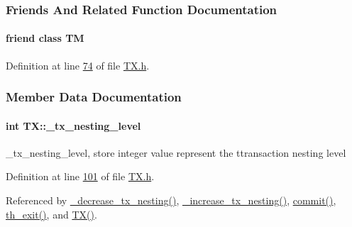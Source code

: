 \subsubsection{Friends And Related Function Documentation}
\paragraph[{\texorpdfstring{TM}{TM}}]{\setlength{\rightskip}{0pt plus 5cm}friend class {\bf TM}\hspace{0.3cm}{\ttfamily [friend]}}\hypertarget{class_t_x_adf1ccda799ef5c419cb43b8ae55eb45c_adf1ccda799ef5c419cb43b8ae55eb45c}{}\label{class_t_x_adf1ccda799ef5c419cb43b8ae55eb45c_adf1ccda799ef5c419cb43b8ae55eb45c}


Definition at line \hyperlink{_t_x_8h_source_l00074}{74} of file \hyperlink{_t_x_8h_source}{T\+X.\+h}.



\subsubsection{Member Data Documentation}
\paragraph[{\texorpdfstring{\+\_\+tx\+\_\+nesting\+\_\+level}{_tx_nesting_level}}]{\setlength{\rightskip}{0pt plus 5cm}int T\+X\+::\+\_\+tx\+\_\+nesting\+\_\+level\hspace{0.3cm}{\ttfamily [private]}}\hypertarget{class_t_x_ae8f413fd7f4fea322e7ad3c668f9898e_ae8f413fd7f4fea322e7ad3c668f9898e}{}\label{class_t_x_ae8f413fd7f4fea322e7ad3c668f9898e_ae8f413fd7f4fea322e7ad3c668f9898e}
\+\_\+tx\+\_\+nesting\+\_\+level, store integer value represent the ttransaction nesting level 

Definition at line \hyperlink{_t_x_8h_source_l00101}{101} of file \hyperlink{_t_x_8h_source}{T\+X.\+h}.



Referenced by \hyperlink{_t_x_8cpp_source_l00279}{\+\_\+decrease\+\_\+tx\+\_\+nesting()}, \hyperlink{_t_x_8cpp_source_l00272}{\+\_\+increase\+\_\+tx\+\_\+nesting()}, \hyperlink{_t_x_8cpp_source_l00177}{commit()}, \hyperlink{_t_x_8cpp_source_l00052}{th\+\_\+exit()}, and \hyperlink{_t_x_8cpp_source_l00036}{T\+X()}.

